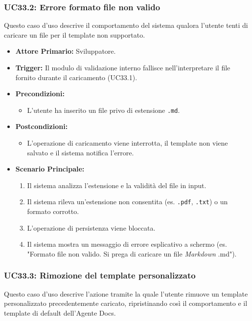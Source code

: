 \documentclass[12pt, a4paper]{article}
\begin{document}
\subsubsection{UC33.2: Errore formato file non valido}\label{uc:33.2}
Questo caso d'uso descrive il comportamento del sistema qualora l'utente tenti di caricare un file per il template non supportato.

\begin{itemize}
    \item \textbf{Attore Primario:} Sviluppatore.
    \item \textbf{Trigger:} Il modulo di validazione interno fallisce nell'interpretare il file fornito durante il caricamento (UC33.1).
    \item \textbf{Precondizioni:}
    \begin{itemize}
        \item L'utente ha inserito un file privo di estensione \texttt{.md}.
    \end{itemize}
    \item \textbf{Postcondizioni:}
    \begin{itemize}
        \item L'operazione di caricamento viene interrotta, il template non viene salvato e il sistema notifica l'errore.
    \end{itemize}
    \item \textbf{Scenario Principale:}
    \begin{enumerate}
        \item Il sistema analizza l'estensione e la validità del file in input.
        \item Il sistema rileva un'estensione non consentita (es. \texttt{.pdf}, \texttt{.txt}) o un formato corrotto.
        \item L'operazione di persistenza viene bloccata.
        \item Il sistema mostra un messaggio di errore esplicativo a schermo (es. "Formato file non valido. Si prega di caricare un file \textit{Markdown} .md").
    \end{enumerate}
\end{itemize}

\subsubsection{UC33.3: Rimozione del template personalizzato}\label{uc:33.3}
Questo caso d'uso descrive l'azione tramite la quale l'utente rimuove un template personalizzato precedentemente caricato, ripristinando così il comportamento e il template di default dell'Agente Docs.
\end{document}
